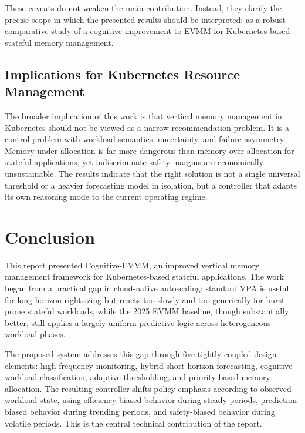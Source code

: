 \documentclass[12pt,a4paper]{article}
\begin{document}
These caveats do not weaken the main contribution. Instead, they clarify the precise scope in which the presented results should be interpreted: as a robust comparative study of a cognitive improvement to EVMM for Kubernetes-based stateful memory management.

\subsection{Implications for Kubernetes Resource Management}

The broader implication of this work is that vertical memory management in Kubernetes should not be viewed as a narrow recommendation problem. It is a control problem with workload semantics, uncertainty, and failure asymmetry. Memory under-allocation is far more dangerous than memory over-allocation for stateful applications, yet indiscriminate safety margins are economically unsustainable. The results indicate that the right solution is not a single universal threshold or a heavier forecasting model in isolation, but a controller that adapts its own reasoning mode to the current operating regime.

\section{Conclusion}
\label{sec:conclusion}

This report presented Cognitive-EVMM, an improved vertical memory management framework for Kubernetes-based stateful applications. The work began from a practical gap in cloud-native autoscaling: standard VPA is useful for long-horizon rightsizing but reacts too slowly and too generically for burst-prone stateful workloads, while the 2025 EVMM baseline, though substantially better, still applies a largely uniform predictive logic across heterogeneous workload phases.

The proposed system addresses this gap through five tightly coupled design elements: high-frequency monitoring, hybrid short-horizon forecasting, cognitive workload classification, adaptive thresholding, and priority-based memory allocation. The resulting controller shifts policy emphasis according to observed workload state, using efficiency-biased behavior during steady periods, prediction-biased behavior during trending periods, and safety-biased behavior during volatile periods. This is the central technical contribution of the report.
\end{document}
